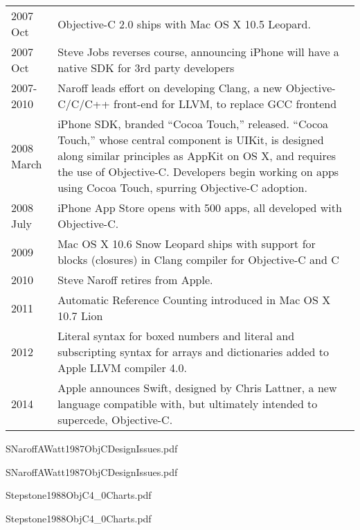 \documentclass[acmsmall,screen]{acmart}
\begin{document}
\begin{longtable}{lp{4.40in}}
2007 Oct 	& Objective-C 2.0 ships with Mac OS X 10.5 Leopard. \\
2007 Oct 	& Steve Jobs reverses course, announcing iPhone will have a native SDK for 3rd party developers \\
2007-2010	& Naroff leads effort on developing Clang, a new Objective-C/C/C++ front-end for LLVM, to replace GCC frontend \\
2008 March	& iPhone SDK, branded ``Cocoa Touch,'' released. ``Cocoa Touch,'' whose central component is UIKit, is designed along similar principles as AppKit on OS X, and requires the use of Objective-C. Developers begin working on apps using Cocoa Touch, spurring Objective-C adoption. \\
2008 July	& iPhone App Store opens with 500 apps, all developed with Objective-C. \\
2009	& Mac OS X 10.6 Snow Leopard ships with support for blocks (closures) in Clang compiler for Objective-C and C \\
2010	& Steve Naroff retires from Apple. \\
2011	& Automatic Reference Counting introduced in Mac OS X 10.7 Lion \\
2012	& Literal syntax for boxed numbers and literal and subscripting syntax for arrays and dictionaries added to Apple LLVM compiler 4.0. \\
2014	& Apple announces Swift, designed by Chris Lattner, a new language compatible with, but ultimately intended to supercede, Objective-C. \\

\end{longtable}


{SNaroffAWatt1987ObjCDesignIssues.pdf}

{SNaroffAWatt1987ObjCDesignIssues.pdf}


{Stepstone1988ObjC4_0Charts.pdf}

{Stepstone1988ObjC4_0Charts.pdf}
\end{document}
